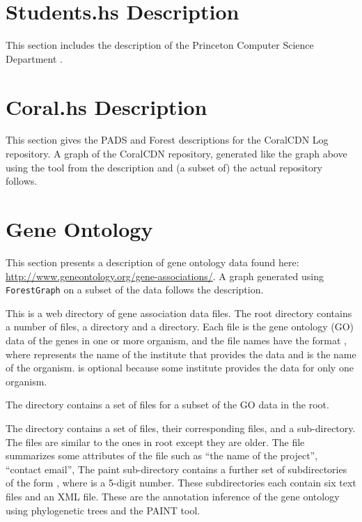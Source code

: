 \documentclass[nocopyrightspace,natbib,onecolumn,9pt]{sigplanconf}
\begin{document}
\section{Students.hs Description}
This section includes the \forest{} description of the Princeton
Computer Science Department \filestore{}.


\newpage

\section{Coral.hs Description}

This section gives the PADS and Forest descriptions for the CoralCDN
Log repository. A graph of the CoralCDN
repository, generated like the graph above using the 
tool from the description and (a subset of) the actual repository 
follows.



\newpage

\section{Gene Ontology}

This section presents a description of gene ontology data found 
here: \url{http://www.geneontology.org/gene-associations/}.
A graph generated using \texttt{ForestGraph}
on a subset of the data follows the description.

This \filestore{} is a web directory of gene association data files.
The root directory contains a number of  files,
a  directory and a  directory.
Each  file is the gene ontology (GO) data of the genes
in one or more organism, and the file names have the format
, where  represents the
name of the institute that provides the data and  is the
name of the organism.  is optional because some institute
provides the data for only one organism.

The  directory contains a set of  files for a
subset of the GO data in the root.

The  directory contains a set of  files, their
corresponding  files, and a  sub-directory.
The  files are similar to the ones
in root except they are older. The  file summarizes
some attributes of the  file such as ``the name of the project'',
``contact email'', \etc{} The paint sub-directory contains
a further set of subdirectories of the form , where
 is a 5-digit number. These subdirectories each contain
six text files and an XML file. These are the annotation inference
of the gene ontology using phylogenetic trees and the PAINT tool.
\end{document}

